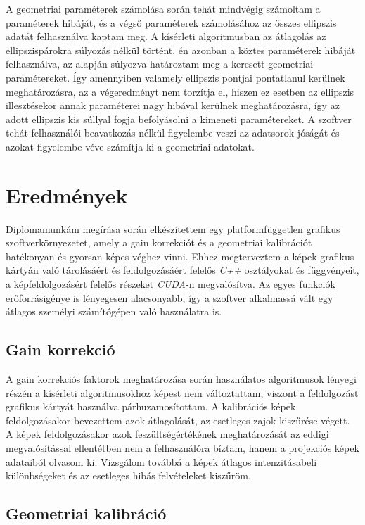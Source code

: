\documentclass[a4paper,12pt]{article}
\begin{document}
A geometriai paraméterek számolása során tehát mindvégig számoltam a paraméterek hibáját, és a végső paraméterek számolásához az összes ellipszis adatát felhasználva kaptam meg. A kísérleti algoritmusban az átlagolás az ellipszispárokra súlyozás nélkül történt, én azonban a köztes paraméterek hibáját felhasználva, az alapján súlyozva határoztam meg a keresett geometriai paramétereket. Így amennyiben valamely ellipszis pontjai pontatlanul kerülnek meghatározásra, az a végeredményt nem torzítja el, hiszen ez esetben az ellipszis illesztésekor annak paraméterei nagy hibával kerülnek meghatározásra, így az adott ellipszis kis súllyal fogja befolyásolni a kimeneti paramétereket. A szoftver tehát felhasználói beavatkozás nélkül figyelembe veszi az adatsorok jóságát és azokat figyelembe véve számítja ki a geometriai adatokat.


\section{Eredmények}

Diplomamunkám megírása során elkészítettem egy platformfüggetlen grafikus szoftverkörnyezetet, amely a gain korrekciót és a geometriai kalibrációt hatékonyan és gyorsan képes véghez vinni. Ehhez megterveztem a képek grafikus kártyán való tárolásáért és feldolgozásáért felelős  \emph{C++} osztályokat és függvényeit, a képfeldolgozásért felelős részeket \emph{CUDA}-n megvalósítva. Az egyes funkciók erőforrásigénye is lényegesen alacsonyabb, így a szoftver alkalmassá vált egy átlagos személyi számítógépen való használatra is. 

\subsection{Gain korrekció}

A gain korrekciós faktorok meghatározása során használatos algoritmusok lényegi részén a kísérleti algoritmusokhoz képest nem változtattam, viszont a feldolgozást grafikus kártyát használva párhuzamosítottam.  A kalibrációs képek feldolgozásakor bevezettem azok átlagolását, az esetleges zajok kiszűrése végett. A képek feldolgozásakor azok feszültségértékének meghatározását az eddigi megvalósítással ellentétben nem a felhasználóra bíztam, hanem a projekciós képek adataiból olvasom ki. Vizsgálom továbbá a képek átlagos intenzitásabeli különbségeket és az esetleges hibás felvételeket kiszűröm.  

\subsection{Geometriai kalibráció}
\end{document}
